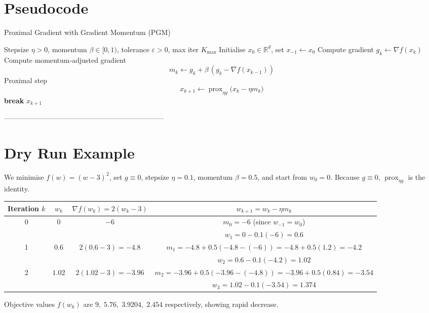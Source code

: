 \documentclass{article}
\newcommand{\prox}{\operatorname{prox}}
\newcommand{\R}{\mathbb{R}}
\newcommand{\norm}[1]{\|#1\|}
\begin{document}
\section*{Pseudocode}
\begin{algorithm}[H]
\caption{Proximal Gradient with Gradient Momentum (PGM)}
\begin{algorithmic}[1]
\Require Stepsize $\eta>0$, momentum $\beta\in[0,1)$, tolerance $\varepsilon>0$, max iter $K_{\max}$
\State Initialise $x_{0}\in\R^{d}$, set $x_{-1}\gets x_{0}$
    \State Compute gradient $g_{k}\gets\nabla f(x_{k})$
    \State Compute momentum‑adjusted gradient 
    \[
    m_{k}\gets g_{k}+\beta\,(g_{k}-\nabla f(x_{k-1}))
    \] 
    \State Proximal step 
    \[
    x_{k+1}\gets \prox_{\eta g}\!\bigl(x_{k}-\eta m_{k}\bigr)
    \]
    \If{$\norm{x_{k+1}-x_{k}}\le\varepsilon$}
        \State \textbf{break}
    \EndIf
\EndFor
\State \Return $x_{k+1}$
\end{algorithmic}
\end{algorithm}

--------------------------------------------------------------------

\section*{Dry Run Example}
We minimise $f(w)=(w-3)^{2}$, set $g\equiv0$, stepsize $\eta=0.1$, momentum $\beta=0.5$,
and start from $w_{0}=0$.  Because $g\equiv0$, $\prox_{\eta g}$ is the identity.

\begin{center}
\begin{tabular}{c|c|c|c}
Iteration $k$ & $w_{k}$ & $\nabla f(w_{k})=2(w_{k}-3)$ & $w_{k+1}=w_{k}-\eta m_{k}$\\\hline
0 & $0$ & $-6$ & $m_{0}= -6$ (since $w_{-1}=w_{0}$)\\
  &   &   & $w_{1}=0-0.1(-6)=0.6$\\\hline
1 & $0.6$ & $2(0.6-3)=-4.8$ & $m_{1}= -4.8+0.5(-4.8-(-6))=-4.8+0.5(1.2)=-4.2$\\
  &   &   & $w_{2}=0.6-0.1(-4.2)=1.02$\\\hline
2 & $1.02$ & $2(1.02-3)=-3.96$ & $m_{2}= -3.96+0.5(-3.96-(-4.8))=-3.96+0.5(0.84)=-3.54$\\
  &   &   & $w_{3}=1.02-0.1(-3.54)=1.374$\\\hline
\end{tabular}
\end{center}
Objective values $f(w_{k})$ are $9,\;5.76,\;3.9204,\;2.454$ respectively, showing rapid decrease.
\end{document}
